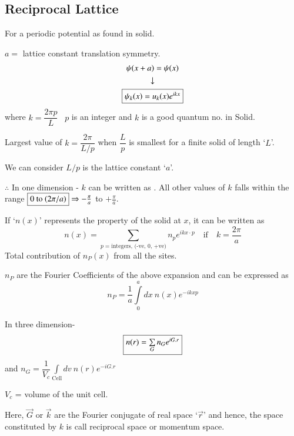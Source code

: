 \chapter{}\label{lec13}

\section*{Reciprocal Lattice}

For a periodic potential as found in solid.

$a=$ lattice constant translation symmetry.
\begin{gather*}
\psi(x+a)=\psi(x)\\
\downarrow\\
\fbox{$\psi_{k}(x)=u_{k}(x)e^{ikx}$}
\end{gather*}
where $k=\dfrac{2\pi p}{L}$ \ $p$ is an integer and $k$ is a good quantum no. in Solid.

Largest value of $k=\dfrac{2\pi}{L/p}$ when $\dfrac{L}{p}$ is smallest for a finite solid of length `$L$'.

We can consider $L/p$ is the lattice constant `$a$'.

$\therefore$ In one dimension - $k$ can be written as . All other values of $k$ falls within the range $\fbox{0 to $(2\pi/a)$} \Rightarrow -\frac{\pi}{a}$ to $+\frac{\pi}{a}$.

If `$n(x)$' represents the property of the solid at $x$, it can be written as
$$
n(x)=\sum\limits_{p=\text{integers, (-ve, 0, +ve)}}n_{p}e^{ikx\cdot p}\quad \text{if}\quad k=\dfrac{2\pi}{a}
$$
Total contribution of $n_{P}(x)$ from all the sites.

$n_{P}$ are the Fourier Coefficients of the above expansion and can be expressed as 
$$
n_{P}=\frac{1}{a}\int\limits^{a}_{0}dx \ n(x)e^{-ikxp}
$$

In three dimension-
$$
\fbox{$n(r)=\sum\limits_{G}n_{G}e^{iG.r}$}
$$
and $n_{G}=\dfrac{1}{V_{c}}\int\limits_{\text{Cell}}dv \ n(r)e^{-iG.r}$

$V_{c}$ = volume of the unit cell.

Here, $\overrightarrow{G}$ or $\overrightarrow{k}$ are the Fourier conjugate of real space `$\overrightarrow{r}$' and hence, the space constituted by $k$ is call reciprocal space or momentum space.

